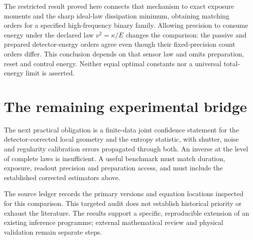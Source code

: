 The restricted result proved here connects that mechanism to exact exposure
moments and the sharp ideal-law dissipation minimum, obtaining matching
orders for a specified high-frequency binary family. Allowing precision to
consume energy under the declared law $\nu^2=\kappa/E$ changes the comparison:
the passive and prepared detector-energy orders agree even though their
fixed-precision count orders differ. This conclusion depends on that sensor
law and omits preparation, reset and control energy. Neither equal optimal
constants nor a universal total-energy limit is asserted.

\section{The remaining experimental bridge}
The next practical obligation is a finite-data joint confidence statement
for the detector-corrected local geometry and the entropy statistic, with
shutter, noise and regularity calibration errors propagated through both.
An inverse at the level of complete laws is insufficient. A useful benchmark
must match duration, exposure, readout precision and preparation access,
and must include the established corrected estimators above.

The source ledger records the primary versions and equation locations
inspected for this comparison. This targeted audit does not establish
historical priority or exhaust the literature. The results support a
specific, reproducible extension of an existing inference programme;
external mathematical review and physical validation remain separate steps.
